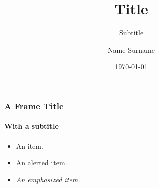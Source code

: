 \documentclass[10pt]{beamer}
\title{Title}
\subtitle{Subtitle}
\author[N. Surname]{Name Surname}
\institute[ShortConf]{Conference Name}
\date[\today]{\today}
\begin{document}
\maketitle

\begin{frame}
	\frametitle{A Frame Title}
	\framesubtitle{With a subtitle}
	\begin{itemize}
		\item An item.
		\item \alert{An alerted item.}
		\item \emph{An emphasized item.}
	\end{itemize}
\end{frame}

\backup
\end{document}
